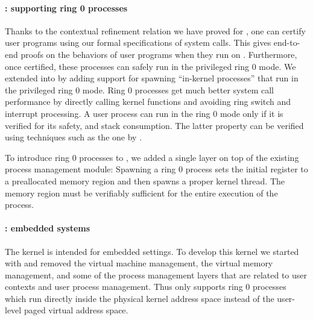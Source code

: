 \paragraph{\mCTOSringz{}: supporting ring 0 processes}

Thanks to the contextual refinement relation we have proved for
\mCTOSbase{}, one can certify user programs using our formal
specifications of system calls. This gives end-to-end proofs on
the behaviors of user programs when they run on \mCTOSbase{}.  
Furthermore, once certified, these processes can safely run in
the privileged ring 0 mode.  We extended \mCTOSbase{} into
\mCTOSringz{} by adding support for spawning ``in-kernel
processes'' that run in the privileged ring 0 mode. 
Ring 0 processes get much
better system call performance by directly calling kernel
functions and avoiding ring switch and interrupt processing. 
A user process can run in the ring 0 mode
only if it is verified for its safety,
and stack consumption. 
The latter property can be verified using techniques
such as the one by \citet{veristack}.

To introduce ring 0 processes to \mCTOSbase{},
we added a single layer on top of the existing process management module:
Spawning a ring 0 process sets the initial  register to a
preallocated memory region and then spawns a proper kernel thread. The
memory region must be verifiably sufficient for the entire execution
of the process. 

\paragraph{\mCTOSembed{}: embedded systems}
The \mCTOSembed{} kernel is intended for embedded settings. To develop
this kernel we started with \mCTOSringz{} and removed the virtual machine management, the virtual
memory management, and some of the process management layers that are
related to user contexts and user process management.  Thus
\mCTOSembed{} only supports ring 0 processes which run directly inside
the physical kernel address space instead of the user-level paged
virtual address space.

